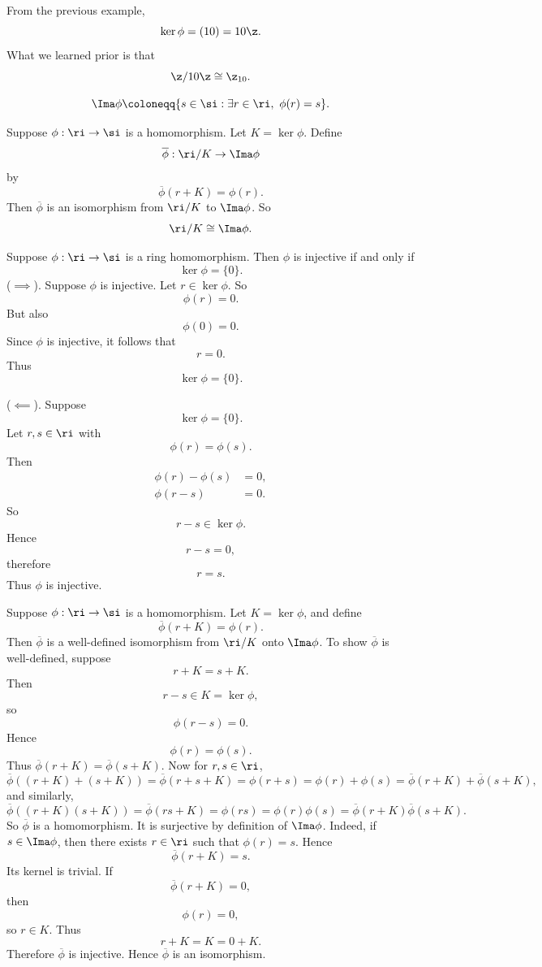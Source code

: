 From the previous example,
\[
\ker\phi=(10)=10\z.
\]
What we learned prior is that
\[
\z/10\z \cong \z_{10}.
\]

\begin{definition}[Image]
\[
\Ima\phi \coloneqq \{s\in \si:\exists r\in \ri,\ \phi(r)=s\}.
\]
\end{definition}

\begin{theorem*}{
Suppose $\phi:\ri\to\si$ is a homomorphism.
Let $K=\ker\phi$.
Define
\[
\overline{\phi}:\ri/K\to \Ima\phi
\]
by
\[
\overline{\phi}(r+K)=\phi(r).
\]
Then $\overline{\phi}$ is an isomorphism from $\ri/K$ to $\Ima\phi$.
So
\[
\ri/K\cong \Ima\phi.
\]
}
\end{theorem*}

\begin{proposition}{
Suppose $\phi:\ri\to\si$ is a ring homomorphism.
Then $\phi$ is injective if and only if
\[
\ker\phi=\{0\}.
\]
}
($\implies$).
Suppose $\phi$ is injective.
Let $r\in \ker\phi$.
So
\[
\phi(r)=0.
\]
But also
\[
\phi(0)=0.
\]
Since $\phi$ is injective, it follows that
\[
r=0.
\]
Thus
\[
\ker\phi=\{0\}.
\]

($\impliedby$).
Suppose
\[
\ker\phi=\{0\}.
\]
Let $r,s\in \ri$ with
\[
\phi(r)=\phi(s).
\]
Then
\begin{align*}
    \phi(r)-\phi(s) &= 0,\\
    \phi(r-s) &= 0.
\end{align*}
So
\[
r-s\in \ker\phi.
\]
Hence
\[
r-s=0,
\]
therefore
\[
r=s.
\]
Thus $\phi$ is injective.
\end{proposition}

\begin{theorem}{
Suppose $\phi:\ri\to\si$ is a homomorphism.
Let $K=\ker\phi$, and define
\[
\overline{\phi}(r+K)=\phi(r).
\]
Then $\overline{\phi}$ is a well-defined isomorphism from $\ri/K$ onto $\Ima\phi$.
}
To show $\overline{\phi}$ is well-defined, suppose
\[
r+K=s+K.
\]
Then
\[
r-s\in K=\ker\phi,
\]
so
\[
\phi(r-s)=0.
\]
Hence
\[
\phi(r)=\phi(s).
\]
Thus $\overline{\phi}(r+K)=\overline{\phi}(s+K)$.
Now for $r,s\in \ri$,
\[
\overline{\phi}((r+K)+(s+K))
=\overline{\phi}(r+s+K)
=\phi(r+s)
=\phi(r)+\phi(s)
=\overline{\phi}(r+K)+\overline{\phi}(s+K),
\]
and similarly,
\[
\overline{\phi}((r+K)(s+K))
=\overline{\phi}(rs+K)
=\phi(rs)
=\phi(r)\phi(s)
=\overline{\phi}(r+K)\overline{\phi}(s+K).
\]
So $\overline{\phi}$ is a homomorphism.
It is surjective by definition of $\Ima\phi$.
Indeed, if $s\in \Ima\phi$, then there exists $r\in \ri$ such that $\phi(r)=s$.
Hence
\[
\overline{\phi}(r+K)=s.
\]
Its kernel is trivial.
If
\[
\overline{\phi}(r+K)=0,
\]
then
\[
\phi(r)=0,
\]
so $r\in K$.
Thus
\[
r+K=K=0+K.
\]
Therefore $\overline{\phi}$ is injective.
Hence $\overline{\phi}$ is an isomorphism.
\end{theorem}

